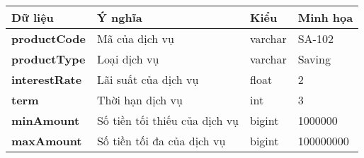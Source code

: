 \begin{center}
    \begin{tabular}{ | m{9em} | m{15em}| m{5em} | m{5em} | } 
    \hline
    \rowcolor{gray!30}
    Dữ liệu & Ý nghĩa & Kiểu & Minh họa \\ 

    \hline
    \textbf{productCode} &
    Mã của dịch vụ &
    varchar &
    SA-102 \\

    \hline
    \textbf{productType} &
    Loại dịch vụ &
    varchar &
    Saving \\

    \hline
    \textbf{interestRate} &
    Lãi suất của dịch vụ &
    float &
    2 \\

    \hline
    \textbf{term} &
    Thời hạn dịch vụ  &
    int &
    3 \\

    \hline
    \textbf{minAmount} &
    Số tiền tối thiếu của dịch vụ &
    bigint &
    1000000 \\

    \hline
    \textbf{maxAmount} &
    Số tiền tối đa của dịch vụ &
    bigint &
    100000000 \\
    
    \hline
    \end{tabular}
\end{center}